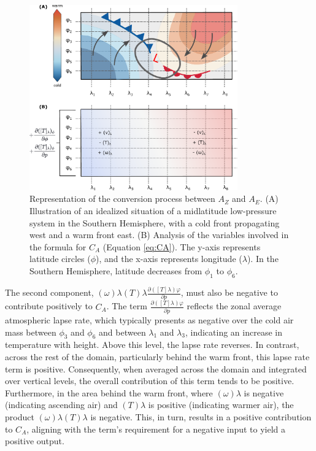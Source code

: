 \begin{figure}[h]
\begin{center}
\includegraphics[width=0.8\textwidth]{fig/Ca.pdf}
\caption[$C_A$ - representation]{Representation of the conversion process between $A_Z$ and $A_E$. (A) Illustration of an idealized situation of a midlatitude low-pressure system in the Southern Hemisphere, with a cold front propagating west and a warm front east. (B) Analysis of the variables involved in the formula for $C_A$ (Equation \ref{eq:CA}). The y-axis represents latitude circles ($\phi$), and the x-axis represents longitude ($\lambda$). In the Southern Hemisphere, latitude decreases from $\phi_1$ to $\phi_6$.}
\label{fig:Ca}
\end{center}
\end{figure}

The second component, $(\omega)\lambda (T)\lambda \frac{\partial ([T]\lambda)\varphi}{\partial p}$, must also be negative to contribute positively to $C_A$. The term $\frac{\partial ([T]\lambda)\varphi}{\partial p}$ reflects the zonal average atmospheric lapse rate, which typically presents as negative over the cold air mass between $\phi_3$ and $\phi_6$ and between $\lambda_1$ and $\lambda_3$, indicating an increase in temperature with height. Above this level, the lapse rate reverses. In contrast, across the rest of the domain, particularly behind the warm front, this lapse rate term is positive. Consequently, when averaged across the domain and integrated over vertical levels, the overall contribution of this term tends to be positive. Furthermore, in the area behind the warm front, where $(\omega)\lambda$ is negative (indicating ascending air) and $(T)\lambda$ is positive (indicating warmer air), the product $(\omega)\lambda (T)\lambda$ is negative. This, in turn, results in a positive contribution to $C_A$, aligning with the term's requirement for a negative input to yield a positive output.

